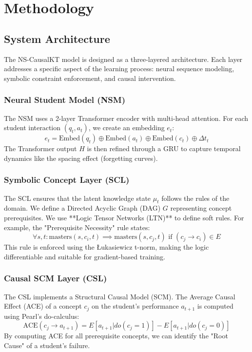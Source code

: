\chapter{Methodology}

\section{System Architecture}
The NS-CausalKT model is designed as a three-layered architecture. Each layer addresses a specific aspect of the learning process: neural sequence modeling, symbolic constraint enforcement, and causal intervention.

\subsection{Neural Student Model (NSM)}
The NSM uses a 2-layer Transformer encoder with multi-head attention. For each student interaction $(q_t, a_t)$, we create an embedding $e_t$:
\begin{equation}
    e_t = \text{Embed}(q_t) \oplus \text{Embed}(a_t) \oplus \text{Embed}(c_t) \oplus \Delta t_t
\end{equation}
The Transformer output $H$ is then refined through a GRU to capture temporal dynamics like the spacing effect (forgetting curves).

\subsection{Symbolic Concept Layer (SCL)}
The SCL ensures that the latent knowledge state $\mu_t$ follows the rules of the domain. We define a Directed Acyclic Graph (DAG) $G$ representing concept prerequisites. We use **Logic Tensor Networks (LTN)** to define soft rules. For example, the "Prerequisite Necessity" rule states:
\begin{equation}
    \forall s, t: \text{masters}(s, c_i, t) \implies \text{masters}(s, c_j, t) \text{ if } (c_j \to c_i) \in E
\end{equation}
This rule is enforced using the Łukasiewicz t-norm, making the logic differentiable and suitable for gradient-based training.

\subsection{Causal SCM Layer (CSL)}
The CSL implements a Structural Causal Model (SCM). The Average Causal Effect (ACE) of a concept $c_j$ on the student's performance $a_{t+1}$ is computed using Pearl's do-calculus:
\begin{equation}
    \text{ACE}(c_j \to a_{t+1}) = E[a_{t+1} | do(c_j=1)] - E[a_{t+1} | do(c_j=0)]
\end{equation}
By computing ACE for all prerequisite concepts, we can identify the "Root Cause" of a student's failure.

